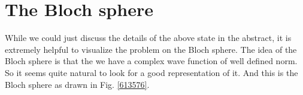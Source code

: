 \section{The Bloch sphere}

While we could just discuss the details of the above state in the abstract, it is extremely helpful to visualize the problem on the Bloch sphere. The idea of the Bloch sphere is that the we have a complex wave function of well defined norm. So it seems quite natural to look for a good representation of it. And this is the Bloch sphere as drawn in Fig. \ref{613576}. 